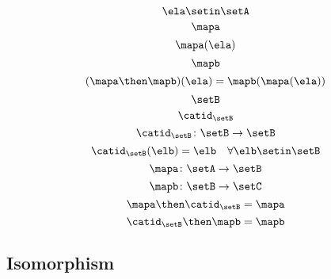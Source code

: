 \begin{forslides}
\begin{equation}
\end{equation}
\begin{equation}\label{eq:slides_session2_136}
\ela \setin\setA
\end{equation}
\begin{equation}\label{eq:slides_session2_137}
\mapa
\end{equation}
\begin{equation}\label{eq:slides_session2_138}
\mapa(\ela)
\end{equation}
\begin{equation}\label{eq:slides_session2_139}
\mapb
\end{equation}
\begin{equation}\label{eq:slides_session2_140}
(\mapa \then \mapb)(\ela) = \mapb(\mapa(\ela))
\end{equation}
\begin{equation}\label{eq:slides_session2_141}
\setB
\end{equation}
\begin{equation}\label{eq:slides_session2_142}
\catid_\setB
\end{equation}
\begin{equation}\label{eq:slides_session2_142a}
\catid_\setB \colon \setB \to \setB
\end{equation}
\begin{equation}\label{eq:slides_session2_143}
\catid_\setB(\elb) = \elb \quad \forall  \elb \setin\setB
\end{equation}
\begin{equation}\label{eq:slides_session2_144}
\mapa \colon \setA \to \setB
\end{equation}
\begin{equation}\label{eq:slides_session2_145}
\mapb \colon \setB \to \setC
\end{equation}
\begin{equation}\label{eq:slides_session2_146}
\mapa \then \catid_\setB = \mapa
\end{equation}
\begin{equation}\label{eq:slides_session2_147}
\catid_\setB \then \mapb = \mapb
\end{equation}

\subsection{Isomorphism}


\end{forslides}
